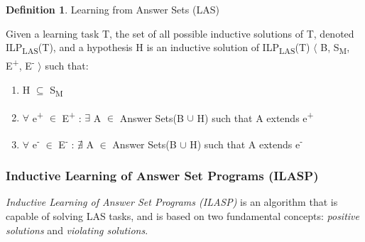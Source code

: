 \documentclass[11pt,twoside]{report}
\theoremstyle{plain}
\theoremstyle{definition}
\newtheorem{defn}[thm]{Definition} %
\newtheorem{examp}{Example}[section]
\begin{document}
\begin{defn}{Learning from Answer Sets (LAS)}

Given a learning task T, the set of all possible inductive solutions of T, denoted ILP\textsubscript{LAS}(T), and a hypothesis H is an inductive solution of ILP\textsubscript{LAS}(T) $\langle$ B, S\textsubscript{M}, E\textsuperscript{+}, E\textsuperscript{-} $\rangle$ such that:
\begin{enumerate}
\item H $\subseteq$ S\textsubscript{M}
\item $\forall$ e\textsuperscript{+} $\in$ E\textsuperscript{+} : $\exists$ A $\in$ Answer Sets(B $\cup$ H) such that A extends e\textsuperscript{+}
\item $\forall$ e\textsuperscript{-} $\in$ E\textsuperscript{-} : $\nexists$ A $\in$ Answer Sets(B $\cup$ H) such that A extends e\textsuperscript{-}
\end{enumerate}

\end{defn}


%
%


\subsubsection{Inductive Learning of Answer Set Programs (ILASP)}

\textit{Inductive Learning of Answer Set Programs (ILASP)} is an algorithm that is capable of solving LAS tasks, and is based on two fundamental concepts: \textit{positive solutions} and \textit{violating solutions}.
\end{document}
